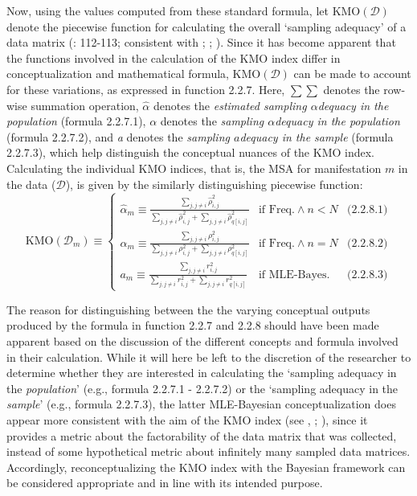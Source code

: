 \documentclass[
  10pt,
  a4paper,
  twoside]{article}
\begin{document}
Now, using the values computed from these standard formula, let \(\text{KMO}(\mathcal{D})\) denote the piecewise function for calculating the overall `sampling adequacy' of a data matrix (: 112-113; consistent with ; ; ). Since it has become apparent that the functions involved in the calculation of the KMO index differ in conceptualization and mathematical formula, \(\text{KMO}(\mathcal{D})\) can be made to account for these variations, as expressed in function 2.2.7. Here, \(\sum \sum\) denotes the row-wise summation operation, \(\hat{\alpha}\) denotes the \emph{estimated sampling \(\alpha\)dequacy in the population} (formula 2.2.7.1), \(\alpha\) denotes the \emph{sampling \(\alpha\)dequacy in the population} (formula 2.2.7.2), and \emph{a} denotes the \emph{sampling \(a\)dequacy in the sample} (formula 2.2.7.3), which help distinguish the conceptual nuances of the KMO index. Calculating the individual KMO indices, that is, the MSA for manifestation \(m\) in the data (\(\mathcal{D}\)), is given by the similarly distinguishing piecewise function:
\[
\text{KMO}(\mathcal{D}_m) \equiv
\left\{
\begin{array}{lll}
\hat{\alpha}_m \equiv \frac{\sum_{j, j \neq i} \hat{\rho}^2_{i,j}}{\sum_{j, j \neq i} \hat{\rho}^2_{i,j} +\sum_{j, j \neq i} \hat{\rho}^2_{q[i,j]}}  & \text{if Freq.} \land n < N & \text{(2.2.8.1)} \\
\alpha_m \equiv \frac{\sum_{j, j \neq i} \rho_{i,j}^2}{\sum_{j, j \neq i} \rho_{i,j}^2 +\sum_{j, j \neq i} \rho^2_{q[i,j]}} & \text{if Freq.} \land n = N & \text{(2.2.8.2)} \\
a_m \equiv \frac{\sum_{j, j \neq i} r_{i,j}^2}{\sum_{j, j \neq i} r_{i,j}^2 +\sum_{j, j \neq i} r^2_{q[i,j]}} & \text{if MLE-Bayes.} & \text{(2.2.8.3)}
\end{array}
\right.
\tag{2.2.8}
\]

The reason for distinguishing between the the varying conceptual outputs produced by the formula in function 2.2.7 and 2.2.8 should have been made apparent based on the discussion of the different concepts and formula involved in their calculation. While it will here be left to the discretion of the researcher to determine whether they are interested in calculating the `sampling adequacy in the \emph{population}' (e.g., formula 2.2.7.1 - 2.2.7.2) or the `sampling adequacy in the \emph{sample}' (e.g., formula 2.2.7.3), the latter MLE-Bayesian conceptualization does appear more consistent with the aim of the KMO index (see , ; ), since it provides a metric about the factorability of the data matrix that was collected, instead of some hypothetical metric about infinitely many sampled data matrices. Accordingly, reconceptualizing the KMO index with the Bayesian framework can be considered appropriate and in line with its intended purpose.
\end{document}
